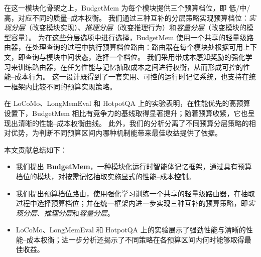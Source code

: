 在这一模块化骨架之上，BudgetMem 为每个模块提供三个预算档位，即 \textsc{低}/\textsc{中}/\textsc{高}，对应不同的质量--成本权衡。
我们通过三种互补的分层策略实现预算档位：\textit{实现分层}（改变模块实现）、\textit{推理分层}（改变推理行为）和\textit{容量分层}（改变模块的模型容量）。
为在这些分层选项中进行选择，BudgetMem 使用一个共享的轻量级路由器，在处理查询的过程中执行预算档位路由：路由器在每个模块处根据可用上下文，即查询与模块中间状态，选择一个档位。
我们采用带成本感知奖励的强化学习来训练路由器，在任务性能与记忆抽取成本之间进行权衡，从而形成可控的性能--成本行为。
这一设计既得到了一套实用、可控的运行时记忆系统，也支持在统一框架内比较不同的预算实现策略。

在 LoCoMo、LongMemEval 和 HotpotQA 上的实验表明，在性能优先的高预算设置下，BudgetMem 相比有竞争力的基线取得显著提升；随着预算收紧，它也呈现出清晰的性能--成本权衡曲线。
此外，我们的分析分离了不同预算分层策略的相对优势，为判断不同预算区间内哪种机制能带来最佳收益提供了依据。

本文贡献总结如下：
\begin{itemize}
\item 我们提出 \textbf{BudgetMem}，一种模块化运行时智能体记忆框架，通过具有预算档位的模块，对按需记忆抽取实施显式的性能--成本控制。
\item 我们提出预算档位路由，使用强化学习训练一个共享的轻量级路由器，在抽取过程中选择预算档位；并在统一框架内进一步实现三种互补的预算策略，即\textit{实现分层}、\textit{推理分层}和\textit{容量分层}。
\item LoCoMo、LongMemEval 和 HotpotQA 上的实验展示了强劲性能与清晰的性能--成本权衡；进一步分析还揭示了不同策略在各预算区间内何时能够取得最佳收益。
\end{itemize}
